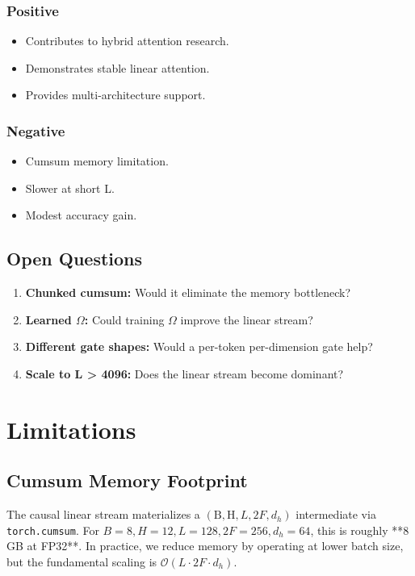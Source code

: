 \subsubsection{Positive}
\begin{itemize}
\item Contributes to hybrid attention research.
\item Demonstrates stable linear attention.
\item Provides multi-architecture support.

\end{itemize}
\subsubsection{Negative}
\begin{itemize}
\item Cumsum memory limitation.
\item Slower at short L.
\item Modest accuracy gain.

\end{itemize}
\subsection{Open Questions}

\begin{enumerate}
\item \textbf{Chunked cumsum:} Would it eliminate the memory bottleneck?
\item \textbf{Learned $\Omega$:} Could training $\Omega$ improve the linear stream?
\item \textbf{Different gate shapes:} Would a per-token per-dimension gate help?
\item \textbf{Scale to L > 4096:} Does the linear stream become dominant?

\end{enumerate}


\section{Limitations}

\subsection{Cumsum Memory Footprint}

The causal linear stream materializes a 
$(\text{B}, \text{H}, L, 2F, d_h)$ intermediate via \texttt{torch.cumsum}. For 
$B = 8, H = 12, L = 128, 2F = 256, d_h = 64$, this is roughly **8 GB at 
FP32**. In practice, we reduce memory by operating at lower batch size, but 
the fundamental scaling is $\mathcal{O}(L \cdot 2F \cdot d_h)$.

